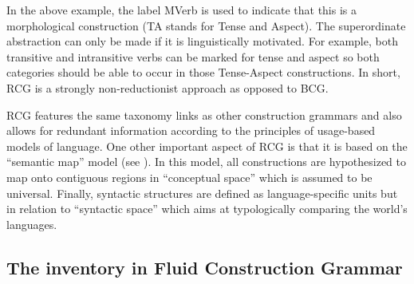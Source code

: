 \ea
{}
\z

In the above example, the label MVerb is used to indicate that this is a morphological construction (TA stands for Tense and Aspect). The superordinate abstraction can only be made if it is linguistically motivated. For example, both transitive and intransitive verbs can be marked for tense and aspect so both categories should be able to occur in those Tense-Aspect constructions. In short, RCG is a strongly non-reductionist approach as opposed to BCG.

RCG features the same taxonomy links as other construction grammars and also allows for redundant information according to the principles of usage-based models of language. One other important aspect of RCG is that it is based on the ``semantic map'' model (see ). In this model, all constructions are hypothesized to map onto contiguous regions in ``conceptual space'' which is assumed to be universal. Finally, syntactic structures are defined as language-specific units but in relation to ``syntactic space'' which aims at typologically comparing the world's languages.

\subsection{The inventory in Fluid Construction Grammar}


